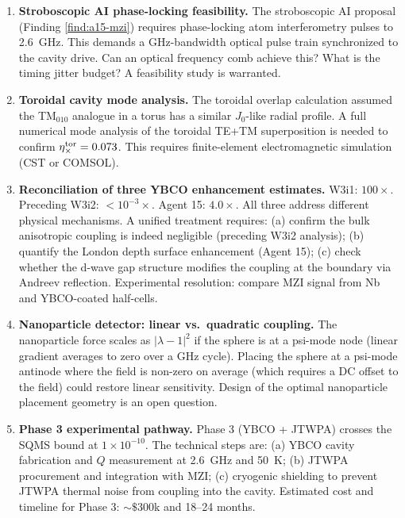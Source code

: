 \documentclass[11pt]{article}
\newcommand{\ee}[1]{\times 10^{#1}}
\begin{document}
\begin{enumerate}

\item \textbf{Stroboscopic AI phase-locking feasibility.}
The stroboscopic AI proposal (Finding \ref{find:a15-mzi}) requires phase-locking
atom interferometry pulses to 2.6~GHz. This demands a GHz-bandwidth optical pulse
train synchronized to the cavity drive. Can an optical frequency comb achieve
this? What is the timing jitter budget? A feasibility study is warranted.

\item \textbf{Toroidal cavity mode analysis.}
The toroidal overlap calculation assumed the TM$_{010}$ analogue in a torus
has a similar $J_0$-like radial profile. A full numerical mode analysis of the
toroidal TE+TM superposition is needed to confirm $\eta_\times^{\rm tor} = 0.073$.
This requires finite-element electromagnetic simulation (CST or COMSOL).

\item \textbf{Reconciliation of three YBCO enhancement estimates.}
W3i1: $100\times$. Preceding W3i2: $< 10^{-3}\times$. Agent 15: $4.0\times$.
All three address different physical mechanisms. A unified treatment requires:
(a) confirm the bulk anisotropic coupling is indeed negligible (preceding W3i2
analysis); (b) quantify the London depth surface enhancement (Agent 15);
(c) check whether the d-wave gap structure modifies the coupling at the
boundary via Andreev reflection. Experimental resolution: compare MZI signal
from Nb and YBCO-coated half-cells.

\item \textbf{Nanoparticle detector: linear vs.\ quadratic coupling.}
The nanoparticle force scales as $|\lambda-1|^2$ if the sphere is at a
psi-mode node (linear gradient averages to zero over a GHz cycle). Placing
the sphere at a psi-mode antinode where the field is non-zero on average
(which requires a DC offset to the field) could restore linear sensitivity.
Design of the optimal nanoparticle placement geometry is an open question.

\item \textbf{Phase 3 experimental pathway.}
Phase 3 (YBCO + JTWPA) crosses the SQMS bound at $1\ee{-10}$. The technical
steps are: (a) YBCO cavity fabrication and $Q$ measurement at 2.6~GHz and
50~K; (b) JTWPA procurement and integration with MZI; (c) cryogenic shielding
to prevent JTWPA thermal noise from coupling into the cavity.
Estimated cost and timeline for Phase 3: $\sim \$300$k and 18--24 months.


\end{enumerate}
\end{document}
